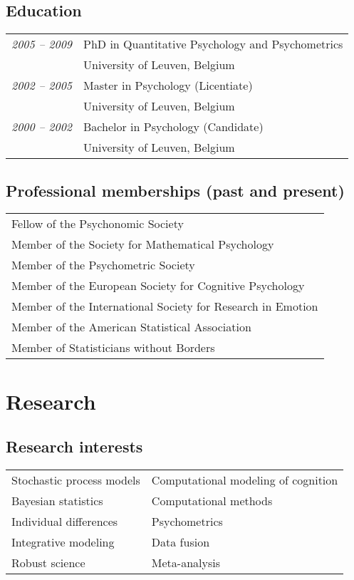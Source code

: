 \documentclass[]{article}
\def\slist{\begin{longtable}{>{\em}p{1.25in} p{5.0in}}}
\def\elist{\end{longtable}}
\def\scolss{\begin{longtable}{p{2in} p{3.5in}}}
\def\ecolss{\end{longtable}}
\def\scolsz{\begin{longtable}{p{5in}}}
\def\ecolsz{\end{longtable}}
\begin{document}
\subsection*{Education}
\slist
  2005 -- 2009 & PhD in Quantitative Psychology and Psychometrics \\ 
               & University of Leuven, Belgium\\
  2002 -- 2005 & Master in Psychology (Licentiate)\\
  			   & University of Leuven, Belgium\\
  2000 -- 2002 & Bachelor in Psychology (Candidate)\\
               & University of Leuven, Belgium\\	
\elist

\subsection*{Professional memberships (past and present)}
\scolsz
  Fellow of the Psychonomic Society\\
  Member of the Society for Mathematical Psychology\\
  Member of the Psychometric Society\\
  Member of the European Society for Cognitive Psychology\\
  Member of the International Society for Research in Emotion\\
  Member of the American Statistical Association\\
  Member of Statisticians without Borders
\ecolsz

\newpage

\section*{Research}
\subsection*{Research interests}
\scolss
   Stochastic process models & Computational modeling of cognition\\
   Bayesian statistics       & Computational methods \\
   Individual differences    & Psychometrics\\
   Integrative modeling      & Data fusion\\
   Robust science            & Meta-analysis
\ecolss
\end{document}
